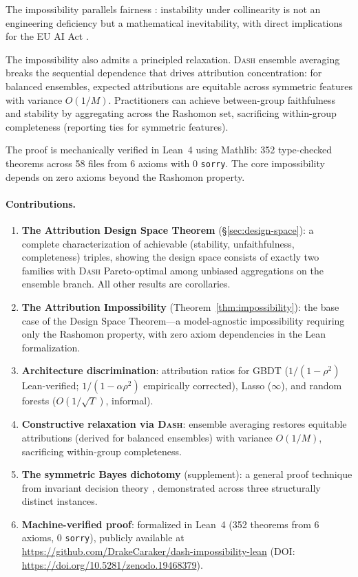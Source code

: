 \documentclass{article}
\newcommand{\DASH}{\textsc{Dash}}
\newcommand{\GBDT}{\textsc{GBDT}}
\begin{document}
The impossibility parallels fairness \citep{chouldechova2017fair,kleinberg2017inherent}: instability under collinearity is not an engineering deficiency but a mathematical inevitability, with direct implications for the EU AI Act \citep{euaiact2024}.

The impossibility also admits a principled relaxation.
\DASH{} ensemble averaging breaks the sequential dependence that drives attribution concentration: for balanced ensembles, expected attributions are equitable across symmetric features with variance $O(1/M)$.
Practitioners can achieve between-group faithfulness and stability by aggregating across the Rashomon set, sacrificing within-group completeness (reporting ties for symmetric features).

The proof is mechanically verified in Lean~4 using Mathlib: 352 type-checked theorems across 58 files from 6 axioms with 0 \texttt{sorry}.
The core impossibility depends on zero axioms beyond the Rashomon property.

\paragraph{Contributions.}
\begin{enumerate}
    \item \textbf{The Attribution Design Space Theorem} (\S\ref{sec:design-space}): a complete characterization of achievable (stability, unfaithfulness, completeness) triples, showing the design space consists of exactly two families with \DASH{} Pareto-optimal among unbiased aggregations on the ensemble branch. All other results are corollaries.
    \item \textbf{The Attribution Impossibility} (Theorem~\ref{thm:impossibility}): the base case of the Design Space Theorem---a model-agnostic impossibility requiring only the Rashomon property, with zero axiom dependencies in the Lean formalization.
    \item \textbf{Architecture discrimination}: attribution ratios for \GBDT{} ($1/(1{-}\rho^2)$ Lean-verified; $1/(1{-}\alpha\rho^2)$ empirically corrected), Lasso ($\infty$), and random forests ($O(1/\sqrt{T})$, informal).
    \item \textbf{Constructive relaxation via \DASH{}}: ensemble averaging restores equitable attributions (derived for balanced ensembles) with variance $O(1/M)$, sacrificing within-group completeness.
    \item \textbf{The symmetric Bayes dichotomy} (supplement): a general proof technique from invariant decision theory \citep{lehmann2005testing}, demonstrated across three structurally distinct instances.
    \item \textbf{Machine-verified proof}: formalized in Lean~4 (352 theorems from 6 axioms, 0 \texttt{sorry}), publicly available at \url{https://github.com/DrakeCaraker/dash-impossibility-lean} (DOI: \url{https://doi.org/10.5281/zenodo.19468379}).
\end{enumerate}
\end{document}
